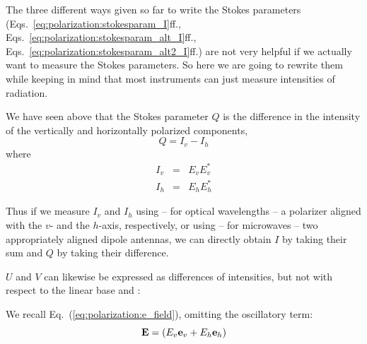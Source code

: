 \label{sec:polarization:measuring}
The three different ways given so far to write the Stokes parameters
(Eqs.~\ref{eq:polarization:stokesparam_I}ff.,
Eqs.~\ref{eq:polarization:stokesparam_alt_I}ff.,
Eqs.~\ref{eq:polarization:stokesparam_alt2_I}ff.)  are not very
helpful if we actually want to measure the Stokes parameters. So here
we are going to rewrite them while keeping in mind that most
instruments can just measure intensities of radiation.

We have seen above that the Stokes parameter $Q$ is the difference in
the intensity of the vertically and horizontally polarized components,
\begin{equation}
  \label{eq:polarization:Q_Idiff}
  Q = I_v - I_h
\end{equation}
where
\begin{eqnarray}
  \label{eq:polarization:Iv}
  I_v &=& E_v E_v^\ast\\
  \label{eq:polarization:Ih}
  I_h &=& E_h E_h^\ast
\end{eqnarray}
  
Thus if we measure $I_v$ and $I_h$ using -- for optical wavelengths --
a polarizer aligned with the $v$- and the $h$-axis, respectively, or
using -- for microwaves -- two appropriately aligned dipole antennas, we
can directly obtain $I$ by taking their sum and $Q$ by taking their
difference.

$U$ and $V$ can likewise be expressed as differences of intensities, but not
with respect to the linear base \eVrt and \eHor:

We recall Eq.~(\ref{eq:polarization:e_field}), omitting the
oscillatory term:
\begin{equation}
  \label{eq:polarization:E_linbase}
  \mathbf{E}= \left(E_v \mathbf{e}_v +  E_h \mathbf{e}_h \right) 
\end{equation}

